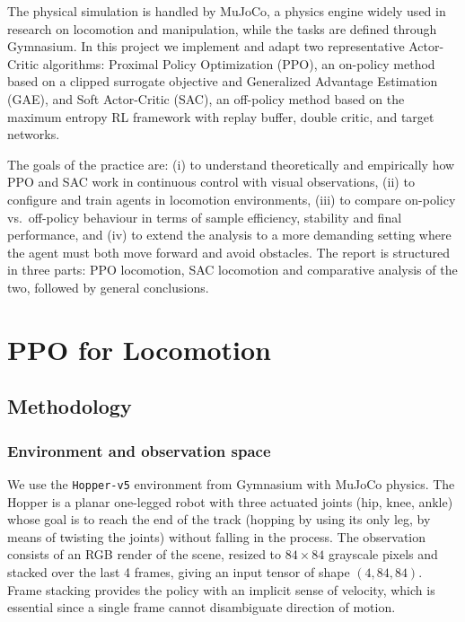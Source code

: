 \documentclass[onecolumn]{cwpreport} %
\begin{document}
The physical simulation is handled by MuJoCo, a physics engine widely used in research on locomotion and manipulation, while the tasks are defined through Gymnasium. In this project we implement and adapt two representative Actor-Critic algorithms: Proximal Policy Optimization (PPO), an on-policy method based on a clipped surrogate objective and Generalized Advantage Estimation (GAE), and Soft Actor-Critic (SAC), an off-policy method based on the maximum entropy RL framework with replay buffer, double critic, and target networks.

The goals of the practice are: (i) to understand theoretically and empirically how PPO and SAC work in continuous control with visual observations, (ii) to configure and train agents in locomotion environments, (iii) to compare on-policy vs.\ off-policy behaviour in terms of sample efficiency, stability and final performance, and (iv) to extend the analysis to a more demanding setting where the agent must both move forward and avoid obstacles. The report is structured in three parts: PPO locomotion, SAC locomotion and comparative analysis of the two, followed by general conclusions.

\section{PPO for Locomotion}
\label{sec:ppo}

\subsection{Methodology}

\subsubsection{Environment and observation space}

We use the \texttt{Hopper-v5} environment from Gymnasium with MuJoCo physics. The Hopper is a planar one-legged robot with three actuated joints (hip, knee, ankle) whose goal is to reach the end of the track (hopping by using its only leg, by means of twisting the joints) without falling in the process. The observation consists of an RGB render of the scene, resized to $84 \times 84$ grayscale pixels and stacked over the last 4 frames, giving an input tensor of shape $(4, 84, 84)$. Frame stacking provides the policy with an implicit sense of velocity, which is essential since a single frame cannot disambiguate direction of motion.
\end{document}
